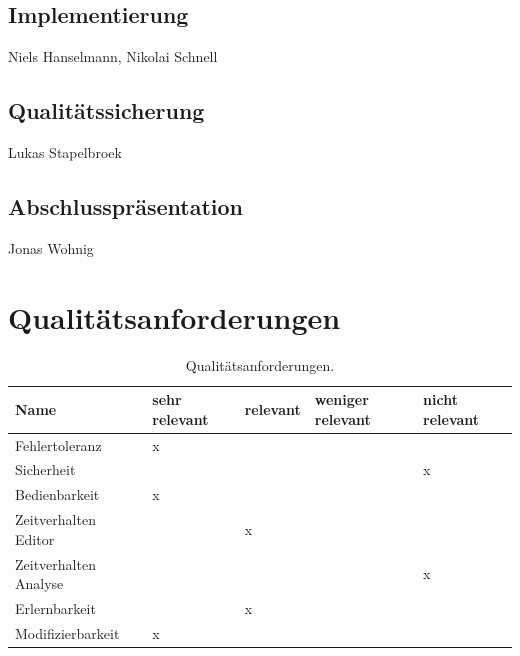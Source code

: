 \documentclass[a4paper]{scrreprt}
\begin{document}
\section{Implementierung} Niels Hanselmann, Nikolai Schnell
\section{Qualitätssicherung} Lukas Stapelbroek
\section{Abschlusspräsentation} Jonas Wohnig


\chapter{Qualitätsanforderungen}

\begin{table}[H]
  \centering
  \begin{tabular}{|P{3cm}|P{2cm}|P{2cm}|P{2cm}|P{2cm}|}
    Name & sehr relevant & relevant & weniger relevant & nicht relevant\\ \hline
    Fehlertoleranz & x &  &  &  \\ \hline
    Sicherheit &  &  &  & x \\ \hline
    Bedienbarkeit & x &  &  &  \\ \hline
  	Zeitverhalten Editor &  & x &  &  \\ \hline
  	Zeitverhalten Analyse &  &  &  & x \\ \hline
  	Erlernbarkeit &  & x &  &  \\ \hline 
    Modifizierbarkeit & x &  &  &  \\
  \end{tabular}
  \newline\newline
  \caption{Qualitätsanforderungen.}\label{qa}
\end{table}


\printglossaries
 

 
\end{document}
